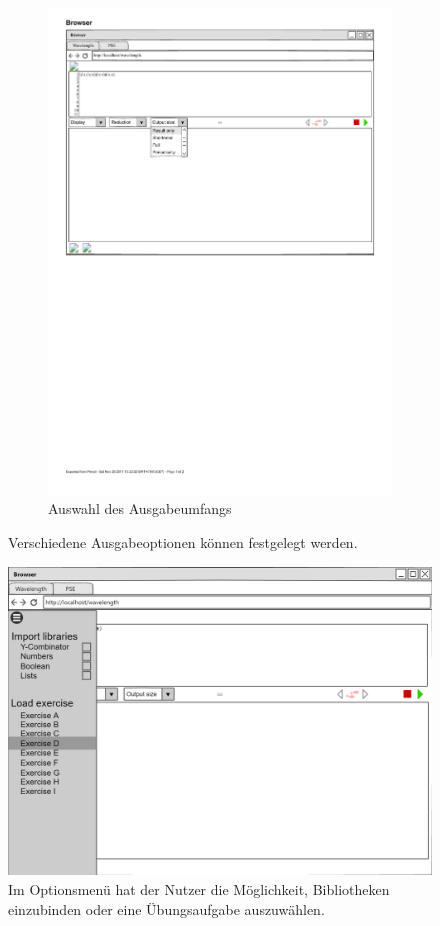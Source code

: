 \documentclass[parskip=full,11pt,twoside]{scrartcl}
\begin{document}
{\begin{figure}[H]
\begin{subfigure}[r]{0.25\textwidth}
		\includegraphics{img/outputSizeMenu}
	\caption{Auswahl des Ausgabeumfangs}	
	\end{subfigure}
	\caption{\label{fig:outputOptions} Verschiedene Ausgabeoptionen können festgelegt werden.}
\end{figure}


\begin{figure}[H]
	\centering
	\includegraphics[width=\textwidth]{img/exercise_menue_open.png}
	\caption{\label{fig:exmenu}Im Optionsmenü hat der Nutzer die Möglichkeit, Bibliotheken einzubinden oder eine Übungsaufgabe auszuwählen.}
\end{figure}

}
\end{document}
